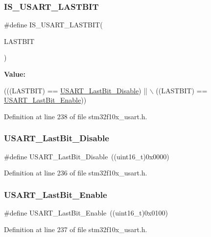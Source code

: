 \subsubsection{\texorpdfstring{I\+S\+\_\+\+U\+S\+A\+R\+T\+\_\+\+L\+A\+S\+T\+B\+IT}{IS\_USART\_LASTBIT}}
{\footnotesize\ttfamily \#define I\+S\+\_\+\+U\+S\+A\+R\+T\+\_\+\+L\+A\+S\+T\+B\+IT(\begin{DoxyParamCaption}\item[{}]{L\+A\+S\+T\+B\+IT }\end{DoxyParamCaption})}

{\bfseries Value\+:}
\begin{DoxyCode}
(((LASTBIT) == \hyperlink{group___u_s_a_r_t___last___bit_ga129c89b9e0dbb3ce43ee92589b3324e5}{USART\_LastBit\_Disable}) || \(\backslash\)
                                   ((LASTBIT) == \hyperlink{group___u_s_a_r_t___last___bit_gaf8c19d1ce01c6efff8c24ee82cc7b52e}{USART\_LastBit\_Enable}))
\end{DoxyCode}


Definition at line 238 of file stm32f10x\+\_\+usart.\+h.

\mbox{\label{group___u_s_a_r_t___last___bit_ga129c89b9e0dbb3ce43ee92589b3324e5}} 
\subsubsection{\texorpdfstring{U\+S\+A\+R\+T\+\_\+\+Last\+Bit\+\_\+\+Disable}{USART\_LastBit\_Disable}}
{\footnotesize\ttfamily \#define U\+S\+A\+R\+T\+\_\+\+Last\+Bit\+\_\+\+Disable~((uint16\+\_\+t)0x0000)}



Definition at line 236 of file stm32f10x\+\_\+usart.\+h.

\mbox{\label{group___u_s_a_r_t___last___bit_gaf8c19d1ce01c6efff8c24ee82cc7b52e}} 
\subsubsection{\texorpdfstring{U\+S\+A\+R\+T\+\_\+\+Last\+Bit\+\_\+\+Enable}{USART\_LastBit\_Enable}}
{\footnotesize\ttfamily \#define U\+S\+A\+R\+T\+\_\+\+Last\+Bit\+\_\+\+Enable~((uint16\+\_\+t)0x0100)}



Definition at line 237 of file stm32f10x\+\_\+usart.\+h.

